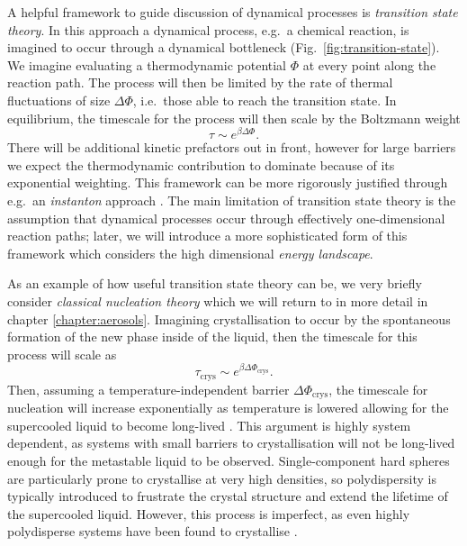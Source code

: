 \documentclass[11pt,twoside]{report}
\begin{document}
A helpful framework to guide discussion of dynamical processes is \emph{transition state theory}.
In this approach a dynamical process, e.g.\ a chemical reaction, is imagined to occur through a dynamical bottleneck (Fig.\ \ref{fig:transition-state}).
We imagine evaluating a thermodynamic potential%
$\Phi$ at every point along the reaction path.
The process will then be limited by the rate of thermal fluctuations of size $\Delta \Phi$, i.e.\ those able to reach the transition state.
In equilibrium, the timescale for the process will then scale by the Boltzmann weight
\begin{equation}\label{eq:reaction-time}
  \tau \sim e^{\beta \Delta \Phi}.
\end{equation}
There will be additional kinetic prefactors out in front, however for large barriers we expect the thermodynamic contribution to dominate because of its exponential weighting.
This framework can be more rigorously justified through e.g.\ an \emph{instanton} approach \cite{LangerAP1969}.
The main limitation of transition state theory is the assumption that dynamical processes occur through effectively one-dimensional reaction paths; later, we will introduce a more sophisticated form of this framework which considers the high dimensional \emph{energy landscape}.

As an example of how useful transition state theory can be, we very briefly consider \emph{classical nucleation theory} which we will return to in more detail in chapter \ref{chapter:aerosols}.
Imagining crystallisation to occur by the spontaneous formation of the new phase inside of the liquid, then the timescale for this process will scale as
\begin{equation*}
  \tau_\mathrm{crys} \sim e^{ \beta \Delta \Phi_\mathrm{crys}}.
\end{equation*}
Then, assuming a temperature-independent barrier $\Delta \Phi_\mathrm{crys}$, the timescale for nucleation will increase exponentially as temperature is lowered allowing for the supercooled liquid to become long-lived \cite{CavagnaPR2009}.
This argument is highly system dependent, as systems with small barriers to crystallisation will not be long-lived enough for the metastable liquid to be observed.
Single-component hard spheres are particularly prone to crystallise at very high densities, so polydispersity is typically introduced to frustrate the crystal structure and extend the lifetime of the supercooled liquid.
However, this process is imperfect, as even highly polydisperse systems have been found to crystallise \cite{BommineniPRL2019,BerthierPRL2016}.
\end{document}
